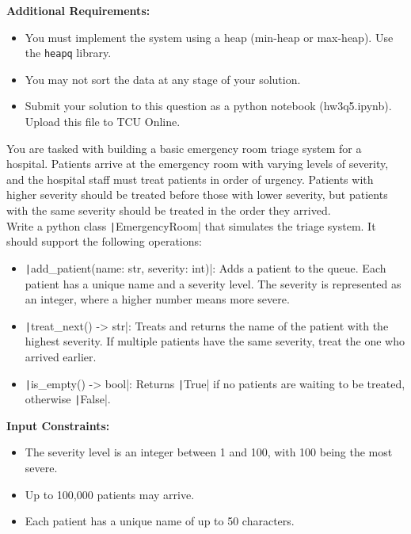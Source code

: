 \documentclass[addpoints,11pt]{exam}
\begin{document}
\begin{questions}
\textbf{Additional Requirements:}
\begin{itemize}
	\item You must implement the system using a heap (min-heap or max-heap).  Use the {\tt heapq} library.
	\item You may not sort the data at any stage of your solution.
	\item Submit your solution to this question as a python notebook (hw3q5.ipynb).  Upload this file to TCU Online.
\end{itemize}
\newpage

	
\question [20]
You are tasked with building a basic emergency room triage system for a hospital. Patients arrive at the emergency room with varying levels of severity, and the hospital staff must treat patients in order of urgency. Patients with higher severity should be treated before those with lower severity, but patients with the same severity should be treated in the order they arrived.\\

Write a python class \texttt|EmergencyRoom| that simulates the triage system. It should support the following operations:
\begin{itemize}
	\item \texttt|add_patient(name: str, severity: int)|: Adds a patient to the queue. Each patient has a unique name and a severity level. The severity is represented as an integer, where a higher number means more severe.
	\item \texttt|treat_next() -> str|: Treats and returns the name of the patient with the highest severity. If multiple patients have the same severity, treat the one who arrived earlier.
	\item \texttt|is_empty() -> bool|: Returns \texttt|True| if no patients are waiting to be treated, otherwise \texttt|False|.
\end{itemize}

\textbf{Input Constraints:}
\begin{itemize}
	\item The severity level is an integer between 1 and 100, with 100 being the most severe.
	\item Up to 100,000 patients may arrive.
	\item Each patient has a unique name of up to 50 characters.
\end{itemize}


\end{questions}
\end{document}
